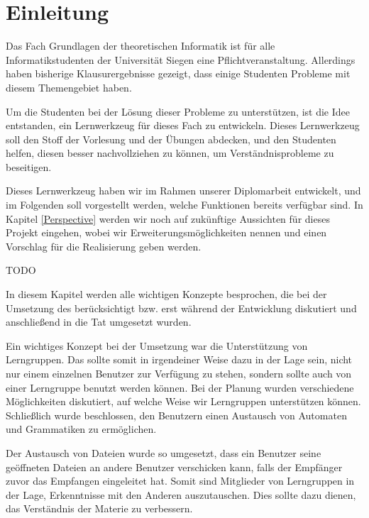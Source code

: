 



\chapter{Einleitung}\label{Introduction}

Das Fach Grundlagen der theoretischen Informatik ist für alle
Informatikstudenten der Universität Siegen eine Pflichtveranstaltung. Allerdings
haben bisherige Klausurergebnisse gezeigt, dass einige Studenten Probleme mit
diesem Themengebiet haben.\vspace{10pt}

Um die Studenten bei der Lösung dieser Probleme zu unterstützen, ist die Idee
entstanden, ein Lernwerkzeug für dieses Fach zu entwickeln. Dieses Lernwerkzeug
soll den Stoff der Vorlesung und der Übungen abdecken, und den Studenten helfen,
diesen besser nachvollziehen zu können, um Verständnisprobleme zu
beseitigen.\vspace{10pt}

Dieses Lernwerkzeug haben wir im Rahmen unserer Diplomarbeit entwickelt, und im
Folgenden soll vorgestellt werden, welche Funktionen bereits verfügbar sind. In
Kapitel \ref{Perspective} werden wir noch auf zukünftige Aussichten für dieses
Projekt eingehen, wobei wir Erweiterungsmöglichkeiten nennen und einen Vorschlag
für die Realisierung geben werden.\vspace{10pt}

TODO

In diesem Kapitel werden alle wichtigen Konzepte besprochen, die bei der
Umsetzung des \gtitools berücksichtigt bzw. erst während der Entwicklung
diskutiert und anschließend in die Tat umgesetzt wurden.\vspace{10pt}

Ein wichtiges Konzept bei der Umsetzung war die Unterstützung von Lerngruppen.
Das \gtitool sollte somit in irgendeiner Weise dazu in der Lage sein, nicht nur
einem einzelnen Benutzer zur Verfügung zu stehen, sondern sollte auch von einer
Lerngruppe benutzt werden können. Bei der Planung wurden verschiedene
Möglichkeiten diskutiert, auf welche Weise wir Lerngruppen unterstützen
können. Schließlich wurde beschlossen, den Benutzern einen Austausch von
Automaten und Grammatiken zu ermöglichen.\vspace{10pt}

Der Austausch von Dateien wurde so umgesetzt, dass ein Benutzer seine geöffneten
Dateien an andere Benutzer verschicken kann, falls der Empfänger zuvor das
Empfangen eingeleitet hat. Somit sind Mitglieder von Lerngruppen in der Lage,
Erkenntnisse mit den Anderen auszutauschen. Dies sollte dazu dienen, das
Verständnis der Materie zu verbessern.\vspace{10pt}

